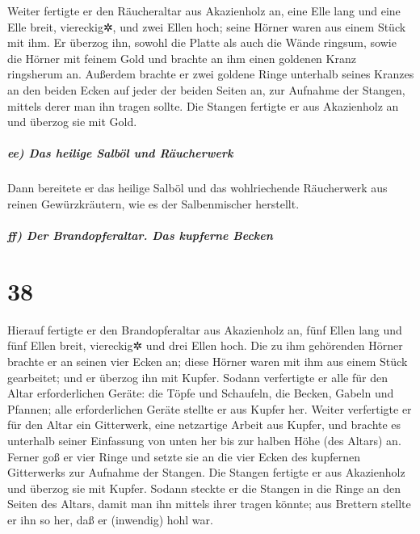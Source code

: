  Weiter fertigte er den Räucheraltar aus Akazienholz an,
eine Elle lang und eine Elle breit, viereckig✲, und zwei Ellen hoch;
seine Hörner waren aus einem Stück mit ihm.  Er überzog
ihn, sowohl die Platte als auch die Wände ringsum, sowie die Hörner mit
feinem Gold und brachte an ihm einen goldenen Kranz ringsherum an.
 Außerdem brachte er zwei goldene Ringe unterhalb seines
Kranzes an den beiden Ecken auf jeder der beiden Seiten an, zur Aufnahme
der Stangen, mittels derer man ihn tragen sollte.  Die
Stangen fertigte er aus Akazienholz an und überzog sie mit Gold.

\hypertarget{ee-das-heilige-salbuxf6l-und-ruxe4ucherwerk}{%
\subparagraph{ee) Das heilige Salböl und
Räucherwerk}\label{ee-das-heilige-salbuxf6l-und-ruxe4ucherwerk}}

 Dann bereitete er das heilige Salböl und das
wohlriechende Räucherwerk aus reinen Gewürzkräutern, wie es der
Salbenmischer herstellt.

\hypertarget{ff-der-brandopferaltar.-das-kupferne-becken}{%
\subparagraph{ff) Der Brandopferaltar. Das kupferne
Becken}\label{ff-der-brandopferaltar.-das-kupferne-becken}}

\hypertarget{section-37}{%
\section{38}\label{section-37}}

 Hierauf fertigte er den Brandopferaltar aus Akazienholz
an, fünf Ellen lang und fünf Ellen breit, viereckig✲ und drei Ellen
hoch.  Die zu ihm gehörenden Hörner brachte er an seinen
vier Ecken an; diese Hörner waren mit ihm aus einem Stück gearbeitet;
und er überzog ihn mit Kupfer.  Sodann verfertigte er alle
für den Altar erforderlichen Geräte: die Töpfe und Schaufeln, die
Becken, Gabeln und Pfannen; alle erforderlichen Geräte stellte er aus
Kupfer her.  Weiter verfertigte er für den Altar ein
Gitterwerk, eine netzartige Arbeit aus Kupfer, und brachte es unterhalb
seiner Einfassung von unten her bis zur halben Höhe (des Altars) an.
 Ferner goß er vier Ringe und setzte sie an die vier Ecken
des kupfernen Gitterwerks zur Aufnahme der Stangen.  Die
Stangen fertigte er aus Akazienholz und überzog sie mit Kupfer.
 Sodann steckte er die Stangen in die Ringe an den Seiten
des Altars, damit man ihn mittels ihrer tragen könnte; aus Brettern
stellte er ihn so her, daß er (inwendig) hohl war.

